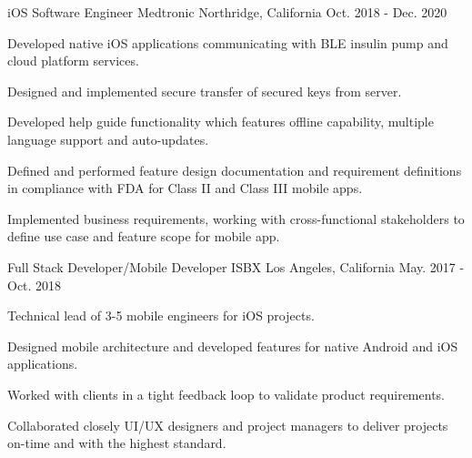 \begin{cventries}
  \cventry
    {iOS Software Engineer} %
    {Medtronic} %
    {Northridge, California} %
    {Oct. 2018 - Dec. 2020} %
    {
      \begin{cvitems} %
        \item {Developed native iOS applications communicating with BLE insulin pump and cloud platform services.}
        \item {Designed and implemented secure transfer of secured keys from server.}
        \item {Developed help guide functionality which features offline capability, multiple language support and auto-updates.}
        \item {Defined and performed feature design documentation and requirement definitions in compliance with FDA for Class II and Class III mobile apps.}
        \item {Implemented business requirements, working with cross-functional stakeholders to define use case and feature scope for mobile app.}
      \end{cvitems}
    }

  \cventry
    {Full Stack Developer/Mobile Developer} %
    {ISBX} %
    {Los Angeles, California} %
    {May. 2017 - Oct. 2018} %
    {
      \begin{cvitems} %
        \item {Technical lead of 3-5 mobile engineers for iOS projects.}
        \item {Designed mobile architecture and developed features for native Android and iOS applications.}
        \item {Worked with clients in a tight feedback loop to validate product requirements.}
        \item {Collaborated closely UI/UX designers and project managers to deliver projects on-time and with the highest standard.}
      \end{cvitems}
    }


\end{cventries}
